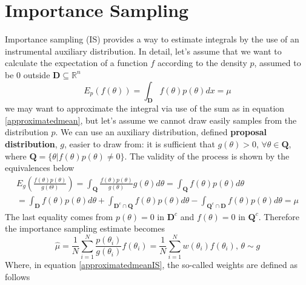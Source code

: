 \documentclass[12pt,mythesisstyle]{report}
\begin{document}
\section{Importance Sampling}\label{section:IS}
\begin{comment}
LEO: FROM PAGE 6 OF AIS PAPER FROM RASHFORD U CAN TAKE THE ESTIMATE OF THE RATIO OF THE NORMALISING CONSTANTS, JUST TAKE THE REFERENCE TO THE PAPER AND CITE THE RESULT
\end{comment}
Importance sampling (IS) provides a way to estimate integrals by the use of an instrumental auxiliary distribution. In detail, let's assume that we want to calculate the expectation of a function $f$ according to the density $p$, assumed to be $0$ outside $\mathbf{D} \subseteq \mathbb{R}^n$
\begin{equation}\label{expectationis}
E_{p}(f(\theta))=\int_{\mathbf{D}} f(\theta) p(\theta) dx=\mu
\end{equation}
we may want to approximate the integral via use of the sum as in equation \eqref{approximatedmean}, but let's assume we cannot draw easily samples from the distribution $p$. We can use an auxiliary distribution, defined \textbf{proposal distribution}, $g$, easier to draw from: it is sufficient that $g(\theta)>0$,  $\forall \theta \in \mathbf{Q}$, where $\mathbf{Q}=\{\theta | f(\theta)p(\theta)\neq 0\}$. The validity of the process is shown by the equivalences below \cite{OwenIS}
\begin{equation}\label{equationISweights}
\begin{aligned}
E_{g}(\frac{f(\theta)p(\theta)}{g(\Theta)})=\int_{\mathbf{Q}} \frac{f(\theta)p(\theta)}{g(\theta)}g(\theta) d\theta=\int_{\mathbf{Q}} f(\theta)p(\theta) d\theta \\
=\int_{\mathbf{D}} f(\theta)p(\theta) d\theta + \int_{\mathbf{D}^c \cap \mathbf{Q}} f(\theta)p(\theta) d\theta -
\int_{\mathbf{Q}^c \cap \mathbf{D}} f(\theta)p(\theta) d\theta=\mu
\end{aligned}
\end{equation}
The last equality comes from $p(\theta)=0 \text{ in } \mathbf{D}^c$ and $f(\theta)=0 \text{ in } \mathbf{Q}^c$.
Therefore the importance sampling estimate becomes
\begin{equation}\label{approximatedmeanIS}
\hat{\mu}=\frac{1}{N}\sum_{i=1}^{N}\frac{p(\theta_{i})}{g(\theta_{i})}f(\theta_{i}) =\frac{1}{N}\sum_{i=1}^{N}w(\theta_{i})f(\theta_{i}) \text{, } \theta \sim g
\end{equation}
Where, in equation \eqref{approximatedmeanIS}, the so-called weights are defined as follows
\end{document}
